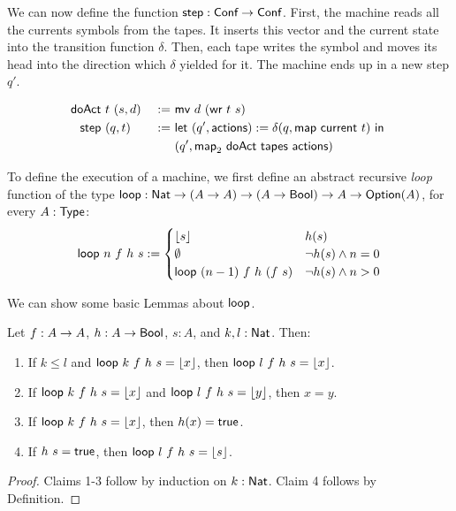 We can now define the function $\textsf{step} : \textsf{Conf} \rightarrow \textsf{Conf}$.  First, the machine reads all the currents symbols from the tapes.  It
inserts this vector and the current state into the transition function $\delta$.  Then, each tape writes the symbol and moves its head into the
direction which $\delta$ yielded for it.  The machine ends up in a new step $q'$.

\begin{definition}[Step]
  \label{def:step}
  \begin{alignat*}{2}
    \textsf{doAct} &~t~(s, d) &~:=~& \textsf{mv}~d~(\textsf{wr}~t~s) \\
    \textsf{step}  &~(q, t)   &~:=~& \textsf{let}~(q', \textsf{actions}) := \delta(q, \textsf{map}~\textsf{current}~t)~\textsf{in}~ \\
               &          &~  ~& (q', \textsf{map}_2~\textsf{doAct}~\textsf{tapes}~\textsf{actions})
  \end{alignat*}
\end{definition}

To define the execution of a machine, we first define an abstract recursive \emph{loop} function of the type
$\textsf{loop} : \textsf{Nat} \rightarrow (A \rightarrow A) \rightarrow (A \rightarrow \textsf{Bool}) \rightarrow A \rightarrow \textsf{Option}(A)$, for every $A:\textsf{Type}$:
\begin{align*}
  \textsf{loop}~n~f~h~s :=
  \begin{cases}
    \left\lfloor {s}\right\rfloor                   & h(s) \\
    \emptyset                      & \lnot h(s) \land n = 0 \\
    \textsf{loop}~(n-1)~f~h~(f~s)  & \lnot h(s) \land n > 0
  \end{cases}
\end{align*}

We can show some basic Lemmas about $\textsf{loop}$.
\begin{lemma}
  \label{lem:loop}
  Let $f : A \rightarrow A$, $h : A \rightarrow \textsf{Bool}$, $s:A$, and $k, l:\textsf{Nat}$.  Then:
  \begin{enumerate}
  \item If $k \le l$ and $\textsf{loop}~k~f~h~s = \left\lfloor {x}\right\rfloor$, then $\textsf{loop}~l~f~h~s = \left\lfloor {x}\right\rfloor$.
  \item If $\textsf{loop}~k~f~h~s = \left\lfloor {x}\right\rfloor$ and $\textsf{loop}~l~f~h~s = \left\lfloor {y}\right\rfloor$, then $x = y$.
  \item If $\textsf{loop}~k~f~h~s = \left\lfloor {x}\right\rfloor$, then $h(x) = \textsf{true}$.
  \item If $h~s = \textsf{true}$, then $\textsf{loop}~l~f~h~s = \left\lfloor {s}\right\rfloor$.
  \end{enumerate}
\end{lemma}
\begin{proof}
  Claims 1-3 follow by induction on $k:\textsf{Nat}$.  Claim 4 follows by Definition.
\end{proof}


